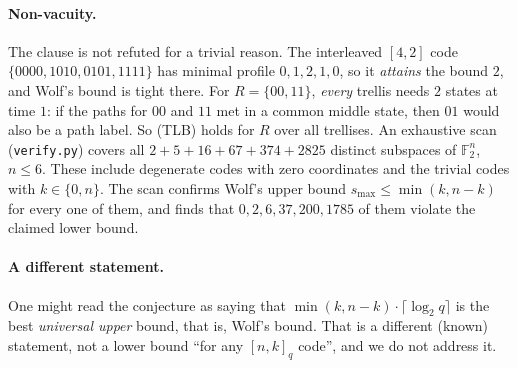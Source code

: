\documentclass[11pt]{article}
\theoremstyle{definition}
\theoremstyle{remark}
\newcommand{\F}{\mathbb{F}}
\newcommand{\smax}{s_{\max}}
\begin{document}
\paragraph{Non-vacuity.} The clause is not refuted for a trivial reason. The interleaved
$[4,2]$ code $\{0000,1010,0101,1111\}$ has minimal profile $0,1,2,1,0$, so it
\emph{attains} the bound $2$, and Wolf's bound is tight there. For $R=\{00,11\}$,
\emph{every} trellis needs $2$ states at time $1$: if the paths for $00$ and $11$ met in
a common middle state, then $01$ would also be a path label. So (TLB) holds for $R$
over all trellises. An exhaustive scan (\texttt{verify.py}) covers all $2+5+16+67+374+2825$
distinct subspaces of $\F_2^n$, $n\le6$. These include degenerate codes with zero coordinates
and the trivial codes with $k\in\{0,n\}$. The scan confirms Wolf's upper bound
$\smax\le\min(k,n-k)$ for every one of them, and finds that
$0,2,6,37,200,1785$ of them violate the claimed lower bound.

\paragraph{A different statement.} One might read the conjecture as saying that
$\min(k,n-k)\cdot\lceil\log_2q\rceil$ is the best \emph{universal upper} bound, that is, Wolf's
bound. That is a different (known) statement, not a lower bound ``for any $[n,k]_q$
code'', and we do not address it.
\end{document}
